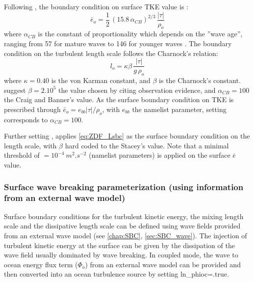 \documentclass[../main/NEMO_manual]{subfiles}
\begin{document}
Following \citet{craig.banner_JPO94}, the boundary condition on surface TKE value is :
\begin{equation}
  \label{eq:ZDF_Esbc}
  \bar{e}_o = \frac{1}{2}\,\left(  15.8\,\alpha_{CB} \right)^{2/3} \,\frac{|\tau|}{\rho_o}
\end{equation}
where $\alpha_{CB}$ is the \citet{craig.banner_JPO94} constant of proportionality which depends on the ''wave age'',
ranging from 57 for mature waves to 146 for younger waves \citep{mellor.blumberg_JPO04}.
The boundary condition on the turbulent length scale follows the Charnock's relation:
\begin{equation}
  \label{eq:ZDF_Lsbc}
  l_o = \kappa \beta \,\frac{|\tau|}{g\,\rho_o}
\end{equation}
where $\kappa=0.40$ is the von Karman constant, and $\beta$ is the Charnock's constant.
\citet{mellor.blumberg_JPO04} suggest $\beta = 2.10^{5}$ the value chosen by
\citet{stacey_JPO99} citing observation evidence, and
$\alpha_{CB} = 100$ the Craig and Banner's value.
As the surface boundary condition on TKE is prescribed through $\bar{e}_o = e_{bb} |\tau| / \rho_o$,
with $e_{bb}$ the  namelist parameter, setting  corresponds
to $\alpha_{CB} = 100$.

Further setting  ,  applies \autoref{eq:ZDF_Lsbc} as the surface boundary condition on the length scale, with $\beta$ hard coded to the Stacey's value. Note that a minimal threshold of $=10^{-4}~m^2.s^{-2}$ (namelist parameters) is applied on the surface $\bar{e}$ value.\\

\subsubsection{Surface wave breaking parameterization (using information from an external wave model)}
\label{subsubsec:ZDF_tke_waveco} 

Surface boundary conditions for the turbulent kinetic energy, the mixing length scale and the dissipative length scale can be defined using wave fields provided from an external wave model (see \autoref{chap:SBC}, \autoref{sec:SBC_wave}). 
The injection of turbulent kinetic energy at the surface can be given by the dissipation of the wave field usually dominated by wave breaking. In coupled mode, the wave to ocean energy flux term ($\Phi_o$) from an external wave model can be provided and then converted into an ocean turbulence source by setting ln\_phioc=.true.
\end{document}
